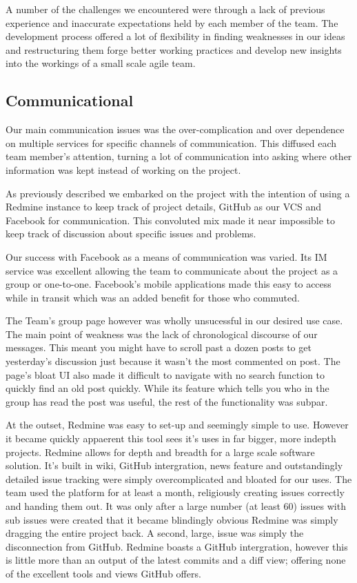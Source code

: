 \documentclass{l3proj}
\begin{document}
A number of the challenges we encountered were through a lack of previous
experience and inaccurate expectations held by each member of the team. The
development process offered a lot of flexibility in finding weaknesses in our
ideas and restructuring them forge better working practices and develop new
insights into the workings of a small scale agile team.

\subsection{Communicational}
Our main communication issues was the over-complication and over dependence on multiple services for specific channels of communication. This diffused each team member's attention, turning a lot of communication into asking where other information was kept instead of working on the project.

As previously described we embarked on the project with the intention of using a Redmine instance to keep track of project details, GitHub as our VCS and Facebook for communication. This convoluted mix made it near impossible to keep track of discussion about specific issues and problems.

Our success with Facebook as a means of communication was varied. Its IM service was excellent allowing the team to communicate about the project as a group or one-to-one. Facebook's mobile applications made this easy to access while in transit which was an added benefit for those who commuted.

The Team's group page however was wholly unsucessful in our desired use case. The main point of weakness was the lack of chronological discourse of our messages. This meant you might have to scroll past a dozen posts to get yesterday's discussion just because it wasn't the most commented on post. The page's bloat UI also made it difficult to navigate with no search function to quickly find an old post quickly. While its feature which tells you who in the group has read the post was useful, the rest of the functionality was subpar.

At the outset, Redmine was easy to set-up and seemingly simple to use. However it became quickly appaerent this tool sees it's uses in far bigger, more indepth projects.
Redmine allows for depth and breadth for a large scale software solution. It's built in wiki, GitHub intergration, news feature and outstandingly detailed issue tracking were simply overcomplicated and bloated for our uses.
The team used the platform for at least a month, religiously creating issues correctly and handing them out. It was only after a large number (at least 60) issues with sub issues were created that it became blindingly obvious Redmine was simply dragging the entire project back.
A second, large, issue was simply the disconnection from GitHub. Redmine boasts a GitHub intergration, however this is little more than an output of the latest commits and a diff view; offering none of the excellent tools and views GitHub offers.
\end{document}
